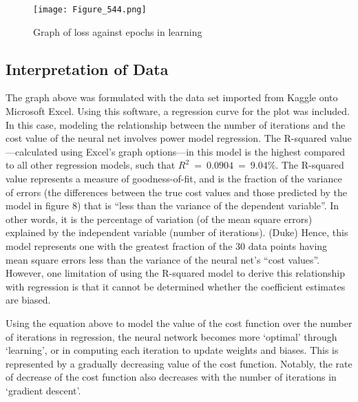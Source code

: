 \documentclass[12pt,a4paper]{article}
\begin{document}
\begin{figure}[h]
    \centering
    \texttt{[image: Figure\_544.png]}
    \caption{Graph of loss against epochs in learning}
    \label{fig:my_label}
\end{figure}




\subsection{Interpretation of Data}
The graph above was formulated with the data set imported from Kaggle onto Microsoft Excel. Using this software, a regression curve for the plot was included. In this case, modeling the relationship between the number of iterations and the cost value of the neural net involves power model regression. The R-squared value—calculated using Excel’s graph options—in this model is the highest compared to all other regression models, such that $R^2\ =\ 0.0904\ =\ 9.04\%$. The R-squared value represents a measure of goodness-of-fit, and is the fraction of the variance of errors (the differences between the true cost values and those predicted by the model in figure 8) that is “less than the variance of the dependent variable”. In other words, it is the percentage of variation (of the mean square errors) explained by the independent variable (number of iterations). (Duke) Hence, this model represents one with the greatest fraction of the 30 data points having mean square errors less than the variance of the neural net’s “cost values”. However, one limitation of using the R-squared model to derive this relationship with regression is that it cannot be determined whether the coefficient estimates are biased.

Using the equation above to model the value of the cost function over the number of iterations in regression, the neural network becomes more ‘optimal’ through ‘learning’, or in computing each iteration to update weights and biases. This is represented by a gradually decreasing value of the cost function. Notably, the rate of decrease of the cost function also decreases with the number of iterations in ‘gradient descent’.
\end{document}
